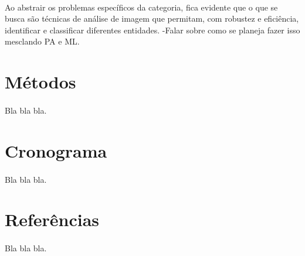 \documentclass[11pt]{report}
\begin{document}
\paragraph{}
Ao abstrair os problemas específicos da categoria, fica evidente que o que se
busca são técnicas de análise de imagem que permitam, com robustez e eficiência,
identificar e classificar diferentes entidades.
-Falar sobre como se planeja fazer isso mesclando PA e ML.

\section{Métodos}
\paragraph{}
Bla bla bla. 

\section{Cronograma}
\paragraph{}
Bla bla bla.

\section{Referências}
\paragraph{}
Bla bla bla.
\end{document}
